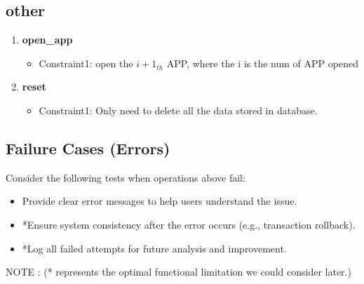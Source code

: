 \documentclass[12pt]{article}
\begin{document}
\subsection{other}
\begin{enumerate}
    \item \textbf{open\_app}
        \begin{itemize}
            \item Constraint1: open the ${i+1}_{th}$ APP, where the i is the num of APP opened 
        \end{itemize}
    \item \textbf{reset}
        \begin{itemize}
            \item Constraint1: Only need to delete all the data stored in database.
        \end{itemize}
\end{enumerate}

\subsection{Failure Cases (Errors)}

Consider the following tests when operations above fail:
\begin{itemize}
    \item Provide clear error messages to help users understand the issue.
    \item *Ensure system consistency after the error occurs (e.g., transaction rollback).
    \item *Log all failed attempts for future analysis and improvement.
\end{itemize}
NOTE : (* represents the optimal functional limitation we could consider later.)
\end{document}
